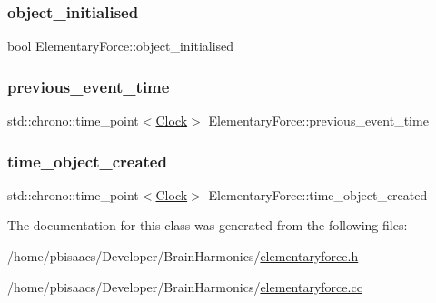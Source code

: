 \subsubsection{\texorpdfstring{object\+\_\+initialised}{object\_initialised}}
{\footnotesize\ttfamily bool Elementary\+Force\+::object\+\_\+initialised\hspace{0.3cm}{\ttfamily [private]}}

\mbox{\label{classElementaryForce_ae61e8203d30c535260a473b0044e0070}} 
\subsubsection{\texorpdfstring{previous\+\_\+event\+\_\+time}{previous\_event\_time}}
{\footnotesize\ttfamily std\+::chrono\+::time\+\_\+point$<$\mbox{\hyperlink{universe_8h_a0ef8d951d1ca5ab3cfaf7ab4c7a6fd80}{Clock}}$>$ Elementary\+Force\+::previous\+\_\+event\+\_\+time\hspace{0.3cm}{\ttfamily [private]}}

\mbox{\label{classElementaryForce_a3c0db9aacae297a036837e127a49741d}} 
\subsubsection{\texorpdfstring{time\+\_\+object\+\_\+created}{time\_object\_created}}
{\footnotesize\ttfamily std\+::chrono\+::time\+\_\+point$<$\mbox{\hyperlink{universe_8h_a0ef8d951d1ca5ab3cfaf7ab4c7a6fd80}{Clock}}$>$ Elementary\+Force\+::time\+\_\+object\+\_\+created\hspace{0.3cm}{\ttfamily [private]}}



The documentation for this class was generated from the following files\+:\begin{DoxyCompactItemize}
\item 
/home/pbisaacs/\+Developer/\+Brain\+Harmonics/\mbox{\hyperlink{elementaryforce_8h}{elementaryforce.\+h}}\item 
/home/pbisaacs/\+Developer/\+Brain\+Harmonics/\mbox{\hyperlink{elementaryforce_8cc}{elementaryforce.\+cc}}\end{DoxyCompactItemize}
